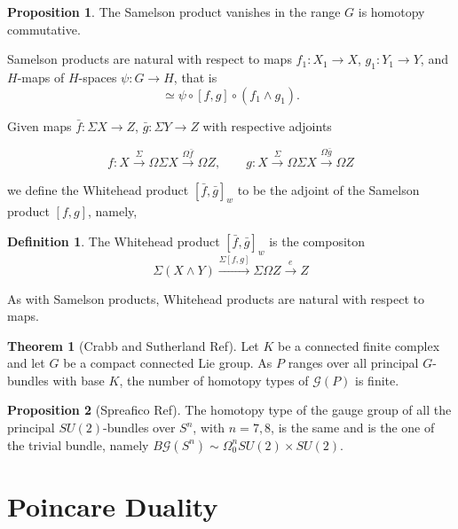 \documentclass[A4,11pt,oneside]{book}
\theoremstyle{definition}
\newtheorem{teo}{Theorem}
\newtheorem{defi}{Definition}
\newtheorem{prop}{Proposition}
\begin{document}
\begin{prop}
The Samelson product vanishes in the range $G$ is homotopy commutative.
\end{prop}

Samelson products are natural with respect to maps $f_1:X_1\rightarrow X$, $g_1:Y_1\rightarrow Y$, and $H$-maps of $H$-spaces $\psi:G\rightarrow H$, that is 
\begin{equation*}
[\psi\circ f\circ f_1,\psi\circ g\circ g_1]\simeq \psi\circ [f, g]\circ(f_1\wedge g_1).
\end{equation*}
 
Given maps $\bar f:\Sigma X\rightarrow Z$, $\bar g:\Sigma Y\rightarrow Z$ with respective adjoints

\begin{equation*}
f:X\overset{\Sigma}{\rightarrow}\Omega\Sigma X\overset{\Omega\bar f}{\rightarrow}\Omega Z,\qquad g:X\overset{\Sigma}{\rightarrow}\Omega\Sigma X\overset{\Omega\bar g}{\rightarrow}\Omega Z
\end{equation*}

we define the Whitehead product $[\bar f,\bar g]_w$ to be the adjoint of the Samelson product $[f,g]$, namely, 
\begin{defi}
The Whitehead product $[\bar f,\bar g]_w$ is the compositon 
\begin{equation*}
\Sigma(X\wedge Y)\overset{\Sigma[f,g]}{\rightarrow}\Sigma\Omega Z\overset{e}{\rightarrow}Z
\end{equation*}
\end{defi}

As with Samelson products, Whitehead products are natural with respect to maps.

\begin{teo}[Crabb and Sutherland Ref] 
Let $K$ be a connected finite complex and let $G$ be a compact connected Lie group. As $P$ ranges over all principal $G$-bundles with base $K$, the number of homotopy types of $\mathcal{G}(P)$ is finite.
\end{teo}

\begin{prop}[Spreafico Ref]
The homotopy type of the gauge group of all the principal $SU(2)$-bundles over $S^n$, with $n=7,8$, is the same and is the one of the trivial bundle, namely $B\mathcal G(S^n)\sim\Omega^n_0SU(2)\times SU(2)$.
\end{prop}

\section{Poincare Duality}
\end{document}
